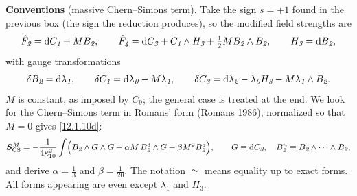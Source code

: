 \begin{tcolorbox}[breakable]
	\begin{remark}
		\textbf{Conventions} (massive Chern--Simons term). Take the sign $s=+1$ found in the previous box (the sign the reduction produces), so the modified field strengths are
		\[
		\hat F_{\textit{2}}=\mathrm{d} C_{\textit{1}}+MB_{\textit{2}},\qquad
		\hat F_{\textit{4}}=\mathrm{d} C_{\textit{3}}+C_{\textit{1}}\wedge H_{\textit{3}}+\tfrac12MB_{\textit{2}}\wedge B_{\textit{2}},\qquad H_{\textit{3}}=\mathrm{d} B_{\textit{2}},
		\]
		with gauge transformations
		\[
		\delta B_{\textit{2}}=\mathrm{d}\lambda_{\textit{1}},\qquad
		\delta C_{\textit{1}}=\mathrm{d}\lambda_{\textit{0}}-M\lambda_{\textit{1}},\qquad
		\delta C_{\textit{3}}=\mathrm{d}\lambda_{\textit{2}}-\lambda_{\textit{0}}H_{\textit{3}}-M\lambda_{\textit{1}}\wedge B_{\textit{2}} .
		\]
		$M$ is constant, as imposed by $C_{\textit{9}}$; the general case is treated at the end. We look for the Chern--Simons term in Romans' form (Romans 1986), normalized so that $M=0$ gives \eqref{12.1.10d}:
		\[
		\bm S^{M}_{\text{CS}}=-\frac{1}{4\kappa_{10}^{2}}\int\Bigl(B_{\textit{2}}\wedge G\wedge G+\alpha M\,B_{\textit{2}}^{3}\wedge G+\beta M^{2}B_{\textit{2}}^{5}\Bigr),\qquad G\equiv\mathrm{d} C_{\textit{3}},\quad B_{\textit{2}}^{n}\equiv B_{\textit{2}}\wedge\cdots\wedge B_{\textit{2}} ,
		\]
		and derive $\alpha=\frac13$ and $\beta=\frac{1}{20}$. The notation $\simeq$ means equality up to exact forms. All forms appearing are even except $\lambda_{\textit{1}}$ and $H_{\textit{3}}$.


\end{remark}
\end{tcolorbox}
